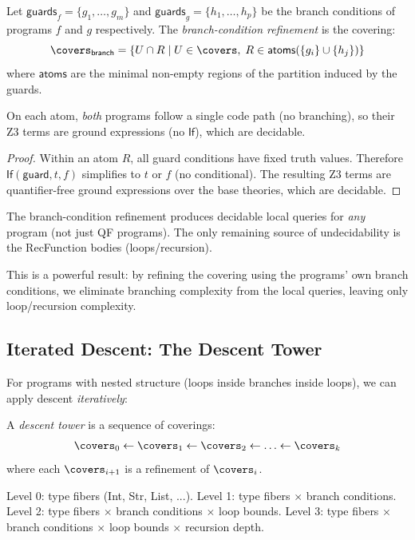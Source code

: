 \begin{theorem}
\label{thm:pred-refinement}
Let $\mathsf{guards}_f = \{g_1, \ldots, g_m\}$ and
$\mathsf{guards}_g = \{h_1, \ldots, h_p\}$ be the branch conditions
of programs $f$ and $g$ respectively.  The \emph{branch-condition
refinement} is the covering:
\[
  \covers_\mathsf{branch} = \{U \cap R \mid U \in \covers,\;
    R \in \mathsf{atoms}(\{g_i\} \cup \{h_j\})\}
\]
where $\mathsf{atoms}$ are the minimal non-empty regions of the
partition induced by the guards.

On each atom, \emph{both} programs follow a single code path
(no branching), so their Z3 terms are ground expressions
(no $\mathsf{If}$), which are decidable.
\end{theorem}

\begin{proof}
Within an atom $R$, all guard conditions have fixed truth values.
Therefore $\mathsf{If}(\mathsf{guard}, t, f)$ simplifies to $t$ or
$f$ (no conditional).  The resulting Z3 terms are quantifier-free
ground expressions over the base theories, which are decidable.
\end{proof}

\begin{corollary}
The branch-condition refinement produces decidable local queries
for \emph{any} program (not just QF programs).  The only remaining
source of undecidability is the RecFunction bodies (loops/recursion).
\end{corollary}

This is a powerful result: by refining the covering using the
programs' own branch conditions, we eliminate branching complexity
from the local queries, leaving only loop/recursion complexity.

\subsection{Iterated Descent: The Descent Tower}

For programs with nested structure (loops inside branches inside
loops), we can apply descent \emph{iteratively}:

\begin{definition}
\label{def:descent-tower}
A \emph{descent tower} is a sequence of coverings:
\[
  \covers_0 \leftarrow \covers_1 \leftarrow \covers_2
    \leftarrow \ldots \leftarrow \covers_k
\]
where each $\covers_{i+1}$ is a refinement of $\covers_i$.

Level 0: type fibers (Int, Str, List, ...).
Level 1: type fibers $\times$ branch conditions.
Level 2: type fibers $\times$ branch conditions $\times$ loop bounds.
Level 3: type fibers $\times$ branch conditions $\times$ loop bounds
  $\times$ recursion depth.
\end{definition}

